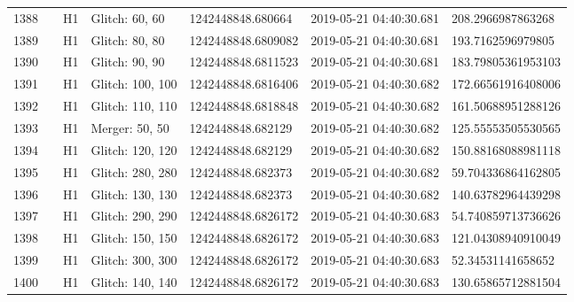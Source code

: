 \begin{longtable}{lllllll}
1388 &                                                    &       H1 &    Glitch: 60, 60 &   1242448848.680664 &  2019-05-21 04:40:30.681 &   208.2966987863268 \\
1389 &                                                    &       H1 &    Glitch: 80, 80 &  1242448848.6809082 &  2019-05-21 04:40:30.681 &   193.7162596979805 \\
1390 &                                                    &       H1 &    Glitch: 90, 90 &  1242448848.6811523 &  2019-05-21 04:40:30.681 &  183.79805361953103 \\
1391 &                                                    &       H1 &  Glitch: 100, 100 &  1242448848.6816406 &  2019-05-21 04:40:30.682 &  172.66561916408006 \\
1392 &                                                    &       H1 &  Glitch: 110, 110 &  1242448848.6818848 &  2019-05-21 04:40:30.682 &  161.50688951288126 \\
1393 &                                                    &       H1 &    Merger: 50, 50 &   1242448848.682129 &  2019-05-21 04:40:30.682 &  125.55553505530565 \\
1394 &                                                    &       H1 &  Glitch: 120, 120 &   1242448848.682129 &  2019-05-21 04:40:30.682 &  150.88168088981118 \\
1395 &                                                    &       H1 &  Glitch: 280, 280 &   1242448848.682373 &  2019-05-21 04:40:30.682 &  59.704336864162805 \\
1396 &                                                    &       H1 &  Glitch: 130, 130 &   1242448848.682373 &  2019-05-21 04:40:30.682 &  140.63782964439298 \\
1397 &                                                    &       H1 &  Glitch: 290, 290 &  1242448848.6826172 &  2019-05-21 04:40:30.683 &  54.740859713736626 \\
1398 &                                                    &       H1 &  Glitch: 150, 150 &  1242448848.6826172 &  2019-05-21 04:40:30.683 &  121.04308940910049 \\
1399 &                                                    &       H1 &  Glitch: 300, 300 &  1242448848.6826172 &  2019-05-21 04:40:30.683 &   52.34531141658652 \\
1400 &                                                    &       H1 &  Glitch: 140, 140 &  1242448848.6826172 &  2019-05-21 04:40:30.683 &  130.65865712881504 \\

\end{longtable}
